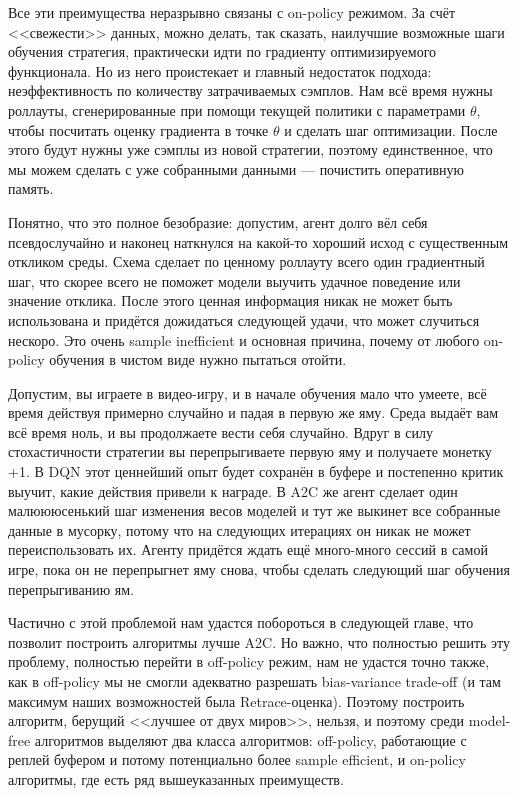 Все эти преимущества неразрывно связаны с on-policy режимом. За счёт <<свежести>> данных, можно делать, так сказать, наилучшие возможные шаги обучения стратегия, практически идти по градиенту оптимизируемого функционала. Но из него проистекает и главный недостаток подхода: неэффективность по количеству затрачиваемых сэмплов. Нам всё время нужны роллауты, сгенерированные при помощи текущей политики с параметрами $\theta$, чтобы посчитать оценку градиента в точке $\theta$ и сделать шаг оптимизации. После этого будут нужны уже сэмплы из новой стратегии, поэтому единственное, что мы можем сделать с уже собранными данными --- почистить оперативную память.

Понятно, что это полное безобразие: допустим, агент долго вёл себя псевдослучайно и наконец наткнулся на какой-то хороший исход с существенным откликом среды. Схема сделает по ценному роллауту всего один градиентный шаг, что скорее всего не поможет модели выучить удачное поведение или значение отклика. После этого ценная информация никак не может быть использована и придётся дожидаться следующей удачи, что может случиться нескоро. Это очень sample inefficient и основная причина, почему от любого on-policy обучения в чистом виде нужно пытаться отойти.

\begin{example}
Допустим, вы играете в видео-игру, и в начале обучения мало что умеете, всё время действуя примерно случайно и падая в первую же яму. Среда выдаёт вам всё время ноль, и вы продолжаете вести себя случайно. Вдруг в силу стохастичности стратегии вы перепрыгиваете первую яму и получаете монетку +1. В DQN этот ценнейший опыт будет сохранён в буфере и постепенно критик выучит, какие действия привели к награде. В A2C же агент сделает один малюююсенький шаг изменения весов моделей и тут же выкинет все собранные данные в мусорку, потому что на следующих итерациях он никак не может переиспользовать их. Агенту придётся ждать ещё много-много сессий в самой игре, пока он не перепрыгнет яму снова, чтобы сделать следующий шаг обучения перепрыгиванию ям.
\end{example}

Частично с этой проблемой нам удастся побороться в следующей главе, что позволит построить алгоритмы лучше A2C. Но важно, что полностью решить эту проблему, полностью перейти в off-policy режим, нам не удастся точно также, как в off-policy мы не смогли адекватно разрешать bias-variance trade-off (и там максимум наших возможностей была Retrace-оценка). Поэтому построить алгоритм, берущий <<лучшее от двух миров>>, нельзя, и поэтому среди model-free алгоритмов выделяют два класса алгоритмов: off-policy, работающие с реплей буфером и потому потенциально более sample efficient, и on-policy алгоритмы, где есть ряд вышеуказанных преимуществ.